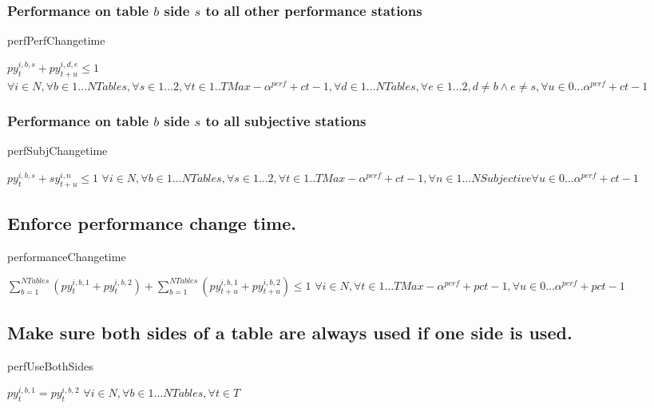 \documentclass[letterpaper,11pt]{report}
\begin{document}
\subsubsection{Performance on table $b$ side $s$ to all other performance
  stations}
\begin{algorithm}
\caption{perfPerfChangetime}
$py_{t}^{i,b,s} + py_{t+u}^{i,d,e} \le 1$
\hfill $\forall i \in N,
\forall b \in 1 \dots NTables,
\forall s \in 1 \dots 2,
\forall t \in 1..{TMax-\alpha^{perf} + ct-1},
\forall d \in 1 \dots NTables ,
\forall e \in 1 \dots 2,
d \neq b  \wedge e \neq s,
\forall u \in 0 \dots \alpha^{perf}+ ct-1$
\end{algorithm}

\subsubsection{Performance on table $b$ side $s$ to all subjective
  stations}
\begin{algorithm}
\caption{perfSubjChangetime}
$py_{t}^{i,b,s} + sy_{t+u}^{i,n} \le 1$
\hfill $\forall i \in N,
\forall b \in 1 \dots NTables,
\forall s \in 1 \dots 2,
\forall t \in 1..{TMax-\alpha^{perf} + ct-1},
\forall n \in 1 \dots NSubjective
\forall u \in 0 \dots \alpha^{perf}+ ct-1$
\end{algorithm}

\FloatBarrier
\subsection{Enforce performance change time.}
\begin{algorithm}
\caption{performanceChangetime}
$
\sum\limits_{b=1}^{NTables} (py_{t}^{i,b,1} + py_{t}^{i,b,2})
+
\sum\limits_{b=1}^{NTables} (py_{t+u}^{i,b,1} + py_{t+u}^{i,b,2}) 
\le 1$
\hfill $\forall i \in N, 
\forall t \in 1 \dots TMax-\alpha^{perf} + pct-1,
\forall u \in 0 \dots \alpha^{perf} + pct-1$
\end{algorithm}

\FloatBarrier
\subsection{Make sure both sides of a table are always used if one side is
  used.}
\begin{algorithm}
\caption{perfUseBothSides}
$py_{t}^{i,b,1} = py_{t}^{i,b,2}$
\hfill $\forall i \in N,
\forall b \in 1 \dots NTables,
\forall t \in T$
\end{algorithm}
\end{document}
